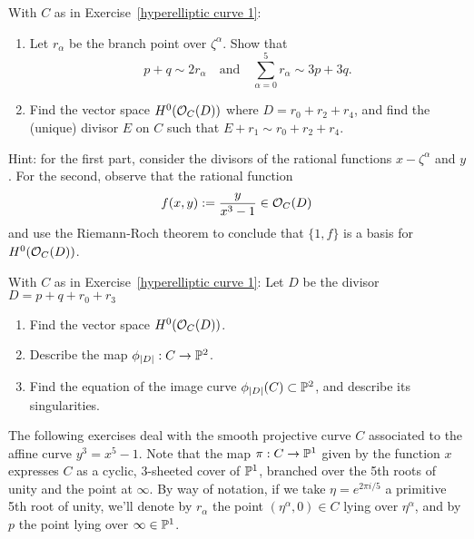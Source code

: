 \begin{exercise} With $C$ as in Exercise~\ref{hyperelliptic curve 1}:
\begin{enumerate}

\item Let $r_\alpha$ be the branch point over $\zeta^\alpha$. Show that
$$
p+q \sim 2r_\alpha \quad \text{and} \quad \sum_{\alpha = 0}^5 r_\alpha \sim 3p+3q.
$$

\item Find the vector space $H^0(\cO_C(D))$ where $D = r_0 + r_2 + r_4$, and find the (unique) divisor $E$ on $C$ such that $E + r_1 \sim r_0 + r_2 + r_4$.

\end{enumerate}

Hint: for the first part, consider the divisors of the rational functions $x-\zeta^\alpha$ and $y$. For the second, observe that the rational function 
$$
f(x,y) := \frac{y}{x^3-1} \in \cO_C(D)
$$
 and use the Riemann-Roch theorem to conclude that $\{1,f\}$ is a basis for $H^0(\cO_C(D))$.
\end{exercise}


\begin{exercise}
With $C$ as in Exercise~\ref{hyperelliptic curve 1}:
Let $D$ be the divisor $D = p + q + r_0 + r_3$
\begin{enumerate}
\item Find the vector space $H^0(\cO_C(D))$.
\item Describe the map $\phi_{|D|} : C \to \PP^2$.
\item Find the equation of the image curve $\phi_{|D|}(C) \subset \PP^2$, and describe its singularities.
\end{enumerate}
\end{exercise}

The following exercises deal with the  
 smooth projective curve $C$ associated to the affine curve $y^3 = x^5 -1$. Note that the map $\pi : C \to \PP^1$ given by the function $x$ expresses $C$ as a cyclic, 3-sheeted cover of $\PP^1$, branched over the 5th roots of unity and the point at $\infty$. By way of notation, if we take $\eta = e^{2\pi i/5}$ a primitive 5th root of unity, we'll denote by $r_\alpha$ the point $(\eta^\alpha, 0) \in C$ lying over $\eta^\alpha$, and by $p$ the point lying over $\infty \in \PP^1$.


